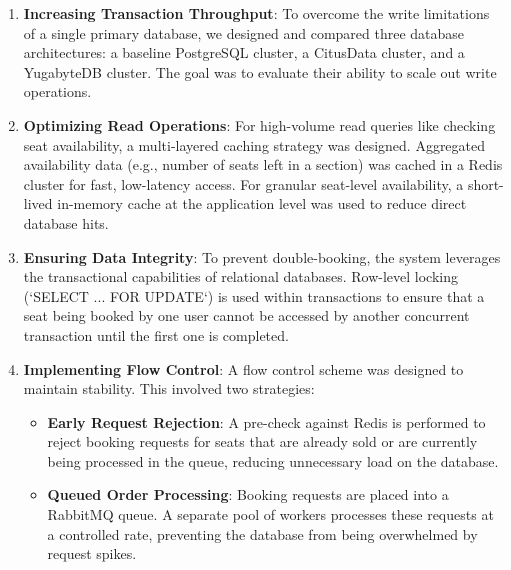 \documentclass{ieeeaccess}
\begin{document}
\begin{enumerate}
\item \textbf{Increasing Transaction Throughput}: To overcome the write limitations of a single primary database, we designed and compared three database architectures: a baseline PostgreSQL cluster, a CitusData cluster, and a YugabyteDB cluster. The goal was to evaluate their ability to scale out write operations.

\item \textbf{Optimizing Read Operations}: For high-volume read queries like checking seat availability, a multi-layered caching strategy was designed. Aggregated availability data (e.g., number of seats left in a section) was cached in a Redis cluster for fast, low-latency access. For granular seat-level availability, a short-lived in-memory cache at the application level was used to reduce direct database hits.

\item \textbf{Ensuring Data Integrity}: To prevent double-booking, the system leverages the transactional capabilities of relational databases. Row-level locking (`SELECT ... FOR UPDATE`) is used within transactions to ensure that a seat being booked by one user cannot be accessed by another concurrent transaction until the first one is completed.

\item \textbf{Implementing Flow Control}: A flow control scheme was designed to maintain stability. This involved two strategies:
    \begin{itemize}
        \item \textbf{Early Request Rejection}: A pre-check against Redis is performed to reject booking requests for seats that are already sold or are currently being processed in the queue, reducing unnecessary load on the database.
        \item \textbf{Queued Order Processing}: Booking requests are placed into a RabbitMQ queue. A separate pool of workers processes these requests at a controlled rate, preventing the database from being overwhelmed by request spikes.
    \end{itemize}

\end{enumerate}
\end{document}
